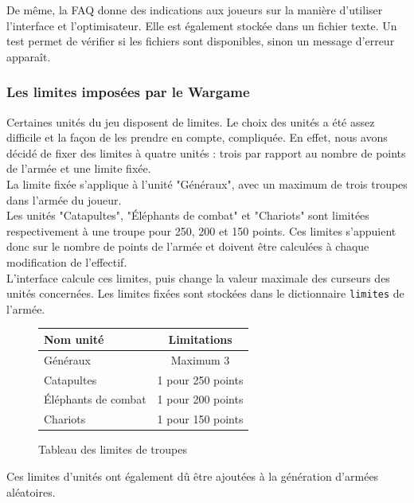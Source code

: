 \documentclass[a4paper]{article} %
\begin{document}
De même, la FAQ donne des indications aux joueurs sur la manière d'utiliser l'interface et l'optimisateur. Elle est également stockée dans un fichier texte. Un test permet de vérifier si les fichiers sont disponibles, sinon un message d'erreur apparaît.

		\subsubsection{Les limites imposées par le Wargame}\label{limitesWargame}

Certaines unités du jeu disposent de limites. Le choix des unités a été assez difficile et la façon de les prendre en compte, compliquée. En effet, nous avons décidé de fixer des limites à quatre unités : trois par rapport au nombre de points de l'armée et une limite fixée.\\

La limite fixée s'applique à l'unité "Généraux", avec un maximum de trois troupes dans l'armée du joueur.\\

Les unités "Catapultes", "Éléphants de combat" et "Chariots" sont limitées respectivement à une troupe pour 250, 200 et 150 points. Ces limites s'appuient donc sur le nombre de points de l'armée et doivent être calculées à chaque modification de l'effectif.
\\
L'interface calcule ces limites, puis change la valeur maximale des curseurs des unités concernées. Les limites fixées sont stockées dans le dictionnaire \texttt{limites} de l'armée.

\begin{figure}[!h]
\begin{center}
\begin{tabular}{|l|c|}
  \hline
  Nom unité & Limitations\\
  \hline
  Généraux & Maximum 3 \\
  Catapultes & 1 pour 250 points \\
  Éléphants de combat & 1 pour 200 points \\
  Chariots & 1 pour 150 points \\
  \hline
\end{tabular}
\end{center}
	\caption{Tableau des limites de troupes\label{tab:limitesTroupes}}
\end{figure}

Ces limites d'unités ont également dû être ajoutées à la génération d'armées aléatoires.
\end{document}
